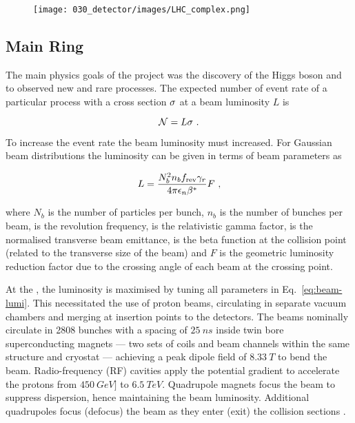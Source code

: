 \begin{figure}[!htbp]
    \centering
    \texttt{[image: 030\_detector/images/LHC\_complex.png]}
    \caption{\cite{Mobs:2197559}}
    \label{fig:LHC-Complex}
\end{figure}

\subsection{\LHC Main Ring}

The main physics goals of the \LHC project was the discovery of the Higgs boson
and to observed new and \SM rare processes. The expected number of event rate of
a particular process with a cross section $\sigma$ at a beam luminosity
$L$ is

\begin{equation}
    \mathcal{N} = L \sigma \ .
\end{equation}

To increase the event rate the beam luminosity must increased. For Gaussian
beam distributions the luminosity can be given in terms of beam parameters as

\begin{equation}
    \label{eq:beam-lumi}
    L = \frac{N_b^2 n_b\frev\relgamma}{4\pi\emitt\bstar} F\ ,
\end{equation}

where $N_b$ is the number of particles per bunch, $n_b$ is the number of bunches
per beam, \frev is the revolution frequency, \relgamma is the relativistic gamma
factor, \emitt is the normalised transverse beam emittance, \bstar is the beta
function at the collision point (related to the transverse size of the beam) and
$F$ is the geometric luminosity reduction factor due to the crossing angle of
each beam at the crossing point.

At the \LHC, the luminosity is maximised by tuning all parameters in
Eq.~\eqref{eq:beam-lumi}. This necessitated the use of proton beams, circulating
in separate vacuum chambers and merging at insertion points to the detectors.
The beams nominally circulate in 2808 bunches with a spacing of ${\SI{25}{ns}}$
inside twin bore superconducting magnets --- two sets of coils and beam channels
within the same structure and cryostat --- achieving a peak dipole field of
${\SI{8.33}{T}}$ to bend the beam. Radio-frequency (RF) cavities apply the
potential gradient to accelerate the protons from ${\SI{450}{GeV}]}$ to
${\SI{6.5}{TeV}}$. Quadrupole magnets focus the beam to suppress dispersion,
hence maintaining the beam luminosity. Additional quadrupoles focus (defocus)
the beam as they enter (exit) the collision sections \cite{Bruning:782076}.

